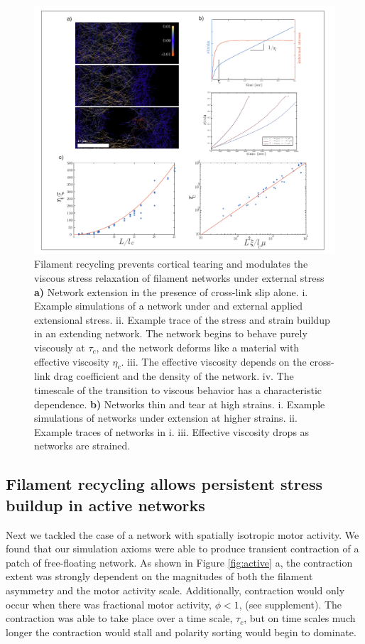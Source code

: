 \documentclass[10pt,letterpaper]{article}
\begin{document}
\begin{figure}[h!]
\centering
\includegraphics[width=\hsize]{figures/fig3/fig3}
\caption{\label{fig:passive} Filament recycling prevents cortical tearing and modulates the viscous stress relaxation of filament networks under external stress \textbf{a)} Network extension in the presence of cross-link slip alone. i. Example simulations of a network under and external applied extensional stress. ii. Example trace of the stress and strain buildup in an extending network.  The network begins to behave purely viscously at $\tau_c$, and the network deforms like a material with effective viscosity $\eta_c$. iii. The effective viscosity depends on the cross-link drag coefficient and the density of the network. iv. The timescale of the transition to viscous behavior has a characteristic dependence. \textbf{b)} Networks thin and tear at high strains. i. Example simulations of networks under extension at higher strains. ii. Example traces of networks in i.  iii.  Effective viscosity drops as networks are strained.  }
\end{figure}



\subsection*{Filament recycling allows persistent stress buildup in active networks}

Next we tackled the case of a network with spatially isotropic motor activity.  We found that our simulation axioms were able to produce transient contraction of a patch of free-floating network.  As shown in Figure \ref{fig:active} a, the contraction extent was strongly dependent on the magnitudes of both the filament asymmetry and the motor activity scale.  Additionally, contraction would only occur when there was fractional motor activity, $\phi<1$, (see supplement).  The contraction was able to take place over a time scale, $\tau_c$, but on time scales much longer the contraction would stall and polarity sorting would begin to dominate.
\end{document}
